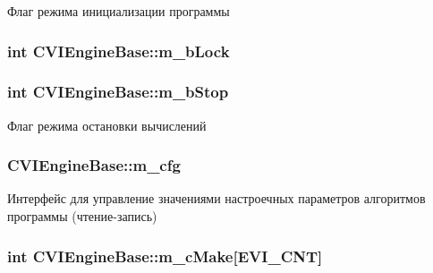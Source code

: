 Флаг режима инициализации программы 

\hypertarget{class_c_v_i_engine_base_aa909c6b38f749c7b4d848f8b2de331bc}{
\subsubsection[{m\+\_\+b\+Lock}]{\setlength{\rightskip}{0pt plus 5cm}int C\+V\+I\+Engine\+Base\+::m\+\_\+b\+Lock}}\label{class_c_v_i_engine_base_aa909c6b38f749c7b4d848f8b2de331bc}




\hypertarget{class_c_v_i_engine_base_a13cd33209e328eed98e79086439748b2}{
\subsubsection[{m\+\_\+b\+Stop}]{\setlength{\rightskip}{0pt plus 5cm}int C\+V\+I\+Engine\+Base\+::m\+\_\+b\+Stop}}\label{class_c_v_i_engine_base_a13cd33209e328eed98e79086439748b2}


Флаг режима остановки вычислений 

\hypertarget{class_c_v_i_engine_base_a867f7342010985b0b21beb4feaf354b8}{
\subsubsection[{m\+\_\+cfg}]{ C\+V\+I\+Engine\+Base\+::m\+\_\+cfg}}\label{class_c_v_i_engine_base_a867f7342010985b0b21beb4feaf354b8}


Интерфейс для управление значениями настроечных параметров алгоритмов программы (чтение-\/запись) 

\hypertarget{class_c_v_i_engine_base_a2c62f336b24d613e0320d2e6f676b89b}{
\subsubsection[{m\+\_\+c\+Make}]{\setlength{\rightskip}{0pt plus 5cm}int C\+V\+I\+Engine\+Base\+::m\+\_\+c\+Make\mbox{[}E\+V\+I\+\_\+\+C\+N\+T\mbox{]}}}\label{class_c_v_i_engine_base_a2c62f336b24d613e0320d2e6f676b89b}




